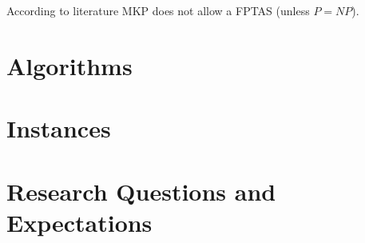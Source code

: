 \documentclass{article}
\begin{document}
According to literature MKP does not allow a FPTAS (unless $P=NP$).


\section{Algorithms}

\section{Instances}

\section{Research Questions and Expectations}
%
\end{document}

